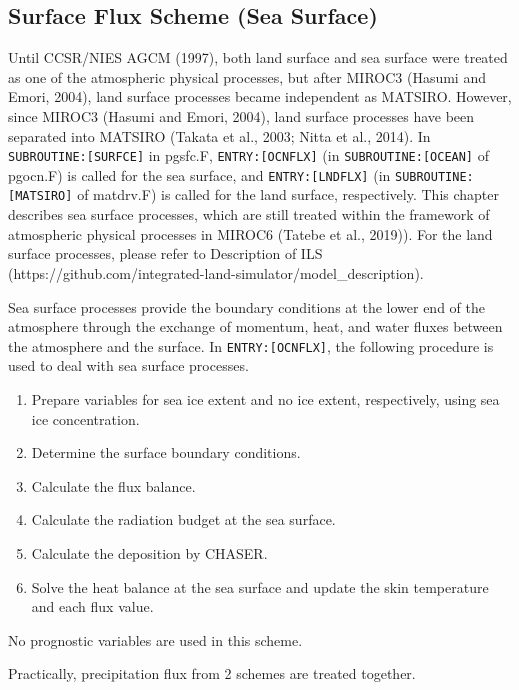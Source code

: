 \hypertarget{surface-flux-scheme-sea-surface}{%
\subsection{Surface Flux Scheme (Sea
Surface)}\label{surface-flux-scheme-sea-surface}}

Until CCSR/NIES AGCM (1997), both land surface and sea surface were
treated as one of the atmospheric physical processes, but after MIROC3
(Hasumi and Emori, 2004), land surface processes became independent as
MATSIRO. However, since MIROC3 (Hasumi and Emori, 2004), land surface
processes have been separated into MATSIRO (Takata et al., 2003; Nitta
et al., 2014). In \texttt{SUBROUTINE:{[}SURFCE{]}} in pgsfc.F,
\texttt{ENTRY:{[}OCNFLX{]}} (in \texttt{SUBROUTINE:{[}OCEAN{]}} of
pgocn.F) is called for the sea surface, and \texttt{ENTRY:{[}LNDFLX{]}}
(in \texttt{SUBROUTINE:{[}MATSIRO{]}} of matdrv.F) is called for the
land surface, respectively. This chapter describes sea surface
processes, which are still treated within the framework of atmospheric
physical processes in MIROC6 (Tatebe et al., 2019)). For the land
surface processes, please refer to Description of ILS
(https://github.com/integrated-land-simulator/model\_description).

Sea surface processes provide the boundary conditions at the lower end
of the atmosphere through the exchange of momentum, heat, and water
fluxes between the atmosphere and the surface. In
\texttt{ENTRY:{[}OCNFLX{]}}, the following procedure is used to deal
with sea surface processes.

\begin{enumerate}
\def\labelenumi{\arabic{enumi}.}
\tightlist
\item
  Prepare variables for sea ice extent and no ice extent, respectively,
  using sea ice concentration.
\item
  Determine the surface boundary conditions.
\item
  Calculate the flux balance.
\item
  Calculate the radiation budget at the sea surface.
\item
  Calculate the deposition by CHASER.
\item
  Solve the heat balance at the sea surface and update the skin
  temperature and each flux value.
\end{enumerate}

No prognostic variables are used in this scheme.

Practically, precipitation flux from 2 schemes are treated together.

